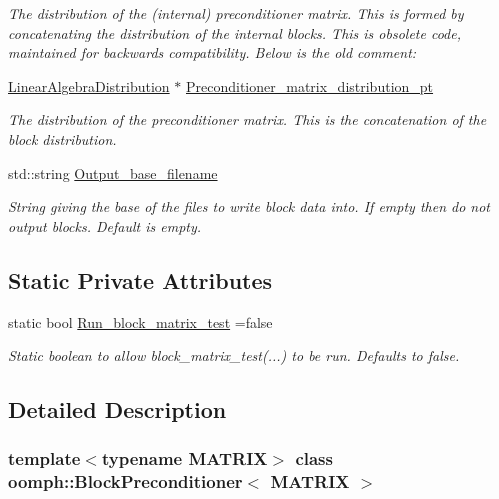 \begin{DoxyCompactItemize}
\begin{DoxyCompactList}\small\item\em The distribution of the (internal) preconditioner matrix. This is formed by concatenating the distribution of the internal blocks. This is obsolete code, maintained for backwards compatibility. Below is the old comment\+: \end{DoxyCompactList}\item 
\hyperlink{classoomph_1_1LinearAlgebraDistribution}{Linear\+Algebra\+Distribution} $\ast$ \hyperlink{classoomph_1_1BlockPreconditioner_ad647cfa61939e3c118dcc2595a7f9240}{Preconditioner\+\_\+matrix\+\_\+distribution\+\_\+pt}
\begin{DoxyCompactList}\small\item\em The distribution of the preconditioner matrix. This is the concatenation of the block distribution. \end{DoxyCompactList}\item 
std\+::string \hyperlink{classoomph_1_1BlockPreconditioner_a915ff2775ccef6ac3dadf072566da9e7}{Output\+\_\+base\+\_\+filename}
\begin{DoxyCompactList}\small\item\em String giving the base of the files to write block data into. If empty then do not output blocks. Default is empty. \end{DoxyCompactList}\end{DoxyCompactItemize}
\subsection*{Static Private Attributes}
\begin{DoxyCompactItemize}
\item 
static bool \hyperlink{classoomph_1_1BlockPreconditioner_a6e6a40988711a64c622c2fd9104c56cf}{Run\+\_\+block\+\_\+matrix\+\_\+test} =false
\begin{DoxyCompactList}\small\item\em Static boolean to allow block\+\_\+matrix\+\_\+test(...) to be run. Defaults to false. \end{DoxyCompactList}\end{DoxyCompactItemize}


\subsection{Detailed Description}
\subsubsection*{template$<$typename M\+A\+T\+R\+IX$>$\newline
class oomph\+::\+Block\+Preconditioner$<$ M\+A\+T\+R\+I\+X $>$}

